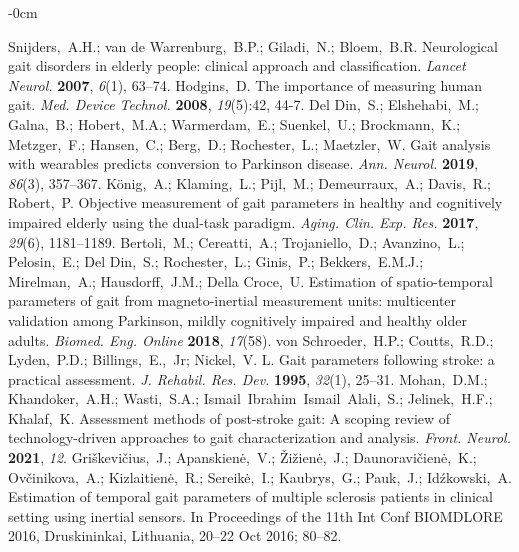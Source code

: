 \documentclass[sensors,article,submit,pdftex,moreauthors]{Definitions/mdpi}
\begin{document}
\begin{adjustwidth}{-\extralength}{0cm}
\begin{thebibliography}{999}
	Snijders,~A.H.; {van de Warrenburg},~B.P.; Giladi,~N.; Bloem,~B.R. Neurological gait disorders in elderly people: clinical approach and classification. {\em Lancet Neurol.} {\bf 2007}, {\em 6}(1), 63--74.
	Hodgins,~D. The importance of measuring human gait. {\em Med. Device Technol.} {\bf 2008}, {\em 19}(5):42, 44-7.
	{Del Din},~S.; Elshehabi,~M.; Galna,~B.; Hobert,~M.A.; Warmerdam,~E.; Suenkel,~U.; Brockmann,~K.; Metzger,~F.; Hansen,~C.; Berg,~D.; Rochester,~L.; Maetzler,~W. Gait analysis with wearables predicts conversion to Parkinson disease. {\em Ann. Neurol.} {\bf 2019}, {\em 86}(3), 357--367.
	K\"{o}nig,~A.; Klaming,~L.; Pijl,~M.; Demeurraux,~A.; Davis,~R.; Robert,~P. Objective measurement of gait parameters in healthy and cognitively impaired elderly using the dual-task paradigm. {\em Aging. Clin. Exp. Res.} {\bf 2017}, {\em 29}(6), 1181--1189.
	Bertoli,~M.; Cereatti,~A.; Trojaniello,~D.; Avanzino,~L.; Pelosin,~E.; Del Din,~S.; Rochester,~L.; Ginis,~P.; Bekkers,~E.M.J.; Mirelman,~A.; Hausdorff,~J.M.; {Della Croce},~U. Estimation of spatio-temporal parameters of gait from magneto-inertial measurement units: multicenter validation among Parkinson, mildly cognitively impaired and healthy older adults. {\em Biomed. Eng. Online} {\bf 2018}, {\em 17}(58).
	von Schroeder,~H.P.; Coutts,~R.D.; Lyden,~P.D.; Billings,~E.,~Jr; Nickel,~V. L. Gait parameters following stroke: a practical assessment. {\em J. Rehabil. Res. Dev.} {\bf 1995}, {\em 32}(1), 25--31.
	Mohan,~D.M.; Khandoker,~A.H.; Wasti,~S.A.; Ismail~Ibrahim~Ismail~Alali,~S.; Jelinek,~H.F.; Khalaf,~K. Assessment methods of post-stroke gait: A scoping review of technology-driven approaches to gait characterization and analysis. {\em Front. Neurol.} {\bf 2021}, {\em 12}.
	Gri\v{s}kevi\v{c}ius,~J.; Apanskien\.{e},~V.; \v{Z}i\v{z}ien\.{e},~J.; Daunoravi\v{c}ien\.{e},~K.; Ov\v{c}inikova,~A.; Kizlaitien\.{e},~R.; Sereik\.{e},~I.; Kaubrys,~G.; Pauk,~J.; Id\'{z}kowski,~A. Estimation of temporal gait parameters of multiple sclerosis patients in clinical setting using inertial sensors. In Proceedings of the 11th Int Conf BIOMDLORE 2016, Druskininkai, Lithuania, 20--22 Oct 2016; 80--82.

\end{thebibliography}
\end{adjustwidth}
\end{document}
